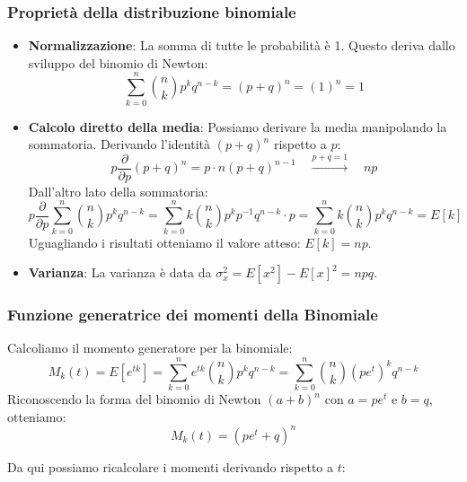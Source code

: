 \documentclass[openany,a4paper,12pt]{book}
\theoremstyle{remark}
\begin{document}
\subsubsection*{Proprietà della distribuzione binomiale}
\begin{itemize}
    \item \textbf{Normalizzazione}: La somma di tutte le probabilità è 1. Questo deriva dallo sviluppo del binomio di Newton:
    \[ \sum_{k=0}^{n} \binom {n}{k}p^kq^{n-k} = (p+q)^n = (1)^n = 1 \]
    
    \item \textbf{Calcolo diretto della media}: Possiamo derivare la media manipolando la sommatoria. Derivando l'identità $(p+q)^n$ rispetto a $p$:
    \[
    p \frac{\partial}{\partial p} (p + q)^n = p \cdot n(p+q)^{n-1} \quad \xrightarrow{p+q=1} \quad np
    \]
    Dall'altro lato della sommatoria:
    \[
    p \frac{\partial}{\partial p} \sum_{k=0}^{n} \binom{n}{k} p^k q^{n-k} = \sum_{k=0}^{n} k \binom{n}{k} p^k p^{-1} q^{n-k} \cdot p = \sum_{k=0}^{n} k \binom{n}{k} p^k q^{n-k} = E[k]
    \]
    Uguagliando i risultati otteniamo il valore atteso: $E[k] = np$.
    
    \item \textbf{Varianza}: La varianza è data da $\sigma_x^2 = E[x^2] - E[x]^2 = npq$.
\end{itemize}

\subsubsection*{Funzione generatrice dei momenti della Binomiale}
Calcoliamo il momento generatore per la binomiale:
\[
M_k(t) = E[e^{tk}] = \sum_{k=0}^{n} e^{tk} \binom{n}{k} p^k q^{n-k} = \sum_{k=0}^{n} \binom{n}{k} (pe^t)^k q^{n-k}
\]
Riconoscendo la forma del binomio di Newton $(a+b)^n$ con $a=pe^t$ e $b=q$, otteniamo:
\[
M_k(t) = (pe^t + q)^n
\]

Da qui possiamo ricalcolare i momenti derivando rispetto a $t$:
\end{document}
